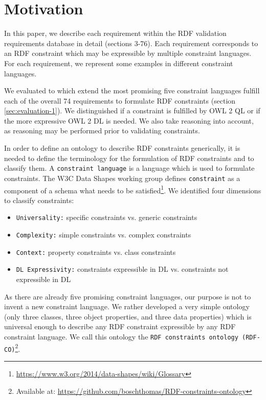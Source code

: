 \documentclass{llncs}
\newcommand{\ms}[1]{\texttt{#1}}
\begin{document}
\section{Motivation}

In this paper, we describe each requirement within the RDF validation requirements database in detail (sections 3-76).
Each requirement corresponds to an RDF constraint which may be expressible by multiple constraint languages.
For each requirement, we represent some examples in different constraint languages.

We evaluated to which extend the most promising five constraint languages fulfill each of the overall 74 requirements to formulate RDF constraints (section \ref{sec:evaluation-1}).
We distinguished if a constraint is fulfilled by OWL 2 QL or if the more expressive OWL 2 DL is needed. 
We also take reasoning into account, as reasoning may be performed prior to validating constraints.

In order to define an ontology to describe RDF constraints generically, it is needed to define the terminology for the formulation of RDF constraints and to classify them. 
A \ms{constraint language} is a language which is used to formulate constraints.
The W3C Data Shapes working group defines \ms{constraint} as a component of a schema what needs to be satisfied\footnote{\url{https://www.w3.org/2014/data-shapes/wiki/Glossary}}.
We identified four dimensions to classify constraints:
\begin{itemize}
  \item \ms{Universality:} specific constraints vs. generic constraints
	\item \ms{Complexity:} simple constraints vs. complex constraints
	\item \ms{Context:} property constraints vs. class constraints
	\item \ms{DL Expressivity:} constraints expressible in DL vs. constraints not expressible in DL
\end{itemize}

As there are already five promising constraint languages, our purpose is not to invent a new constraint language.
We rather developed a very simple ontology (only three classes, three object properties, and three data properties) which is universal enough to describe any RDF constraint expressible by any RDF constraint language.
We call this ontology the \ms{RDF constraints ontology (RDF-CO)}\footnote{Available at: \url{https://github.com/boschthomas/RDF-constraints-ontology}}.
\end{document}
